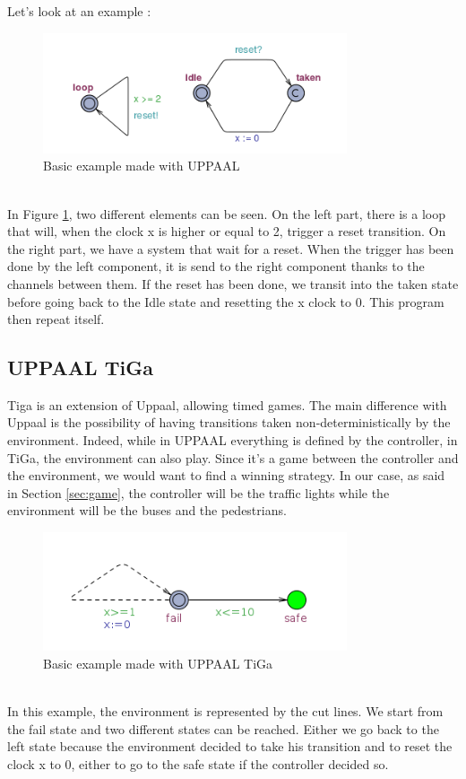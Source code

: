 Let's look at an example :
\begin{figure}[H]\label{fig:uppaal}
  \begin{center}
    \includegraphics[width=0.8\textwidth]{picture/uppaal.png}
    \caption{Basic example made with UPPAAL}
  \end{center}
\end{figure} \\
 In Figure \ref{fig:uppaal}, two different elements can be seen. On the left part, there is a loop that will, when the clock x is higher or equal to 2, trigger a reset transition. On the right part, we have a system that wait for a reset. When the trigger has been done by the left component, it is send to the right component thanks to the channels between them. If the reset has been done, we transit into the taken state before going back to the Idle state and resetting the x clock to 0. This program then repeat itself.
 
 \subsection{UPPAAL TiGa}
 Tiga is an extension of Uppaal, allowing timed games. The main difference with Uppaal is the possibility of having transitions taken non-deterministically by the environment. Indeed, while in UPPAAL everything is defined by the controller, in TiGa, the environment can also play. Since it's a game between the controller and the environment, we would want to find a winning strategy. In our case, as said in Section \ref{sec:game}, the controller will be the traffic lights while the environment will be the buses and the pedestrians.
 \begin{figure}[H]\label{fig:tiga}
  \begin{center}
    \includegraphics[width=0.8\textwidth]{picture/tiga.png}
    \caption{Basic example made with UPPAAL TiGa}
  \end{center}
\end{figure} \\
In this example, the environment is represented by the cut lines. We start from the fail state and two different states can be reached. Either we go back to the left state because the environment decided to take his transition and to reset the clock x to 0, either to go to the safe state if the controller decided so. 